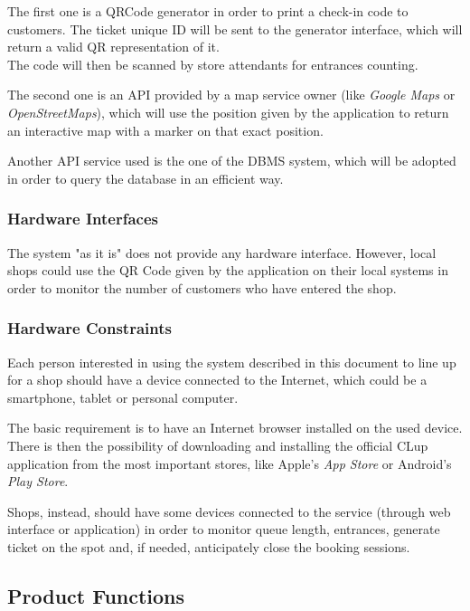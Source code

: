 \documentclass[table, 12pt]{article}
\begin{document}
The first one is a QRCode generator in order to print a check-in code to customers.
The ticket unique ID will be sent to the generator interface, which will return a valid QR representation of it.\\
The code will then be scanned by store attendants for entrances counting.

The second one is an API provided by a map service owner (like \textit{Google Maps} or \textit{OpenStreetMaps}), which will use the position given by the application to return an interactive map with a marker on that exact position.

Another API service used is the one of the DBMS system, which will be adopted in order to query the database in an efficient way.
\subsubsection{Hardware Interfaces}
The system "as it is" does not provide any hardware interface. However, local shops could use the QR Code given by the application on their local systems in order to monitor the number of customers who have entered the shop.
\subsubsection{Hardware Constraints}
Each person interested in using the system described in this document to line up for a shop should have a device connected to the Internet, which could be a smartphone, tablet or personal computer.

The basic requirement is to have an Internet browser installed on the used device.
There is then the possibility of downloading and installing the official CLup application from the most important stores, like Apple's \textit{App Store} or Android's \textit{Play Store}.

Shops, instead, should have some devices connected to the service (through web interface or application) in order to monitor queue length, entrances, generate ticket on the spot and, if needed, anticipately close the booking sessions.

\newpage
\subsection{Product Functions}
\label{product_functions}
\end{document}
